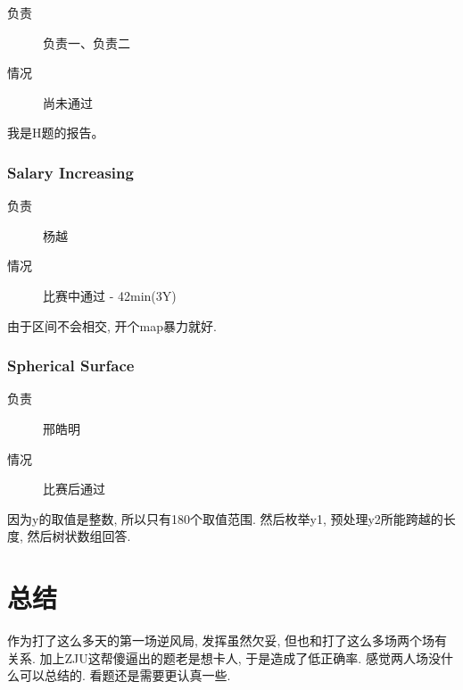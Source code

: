 \documentclass[a4paper, 11pt, nofonts, nocap, fancyhdr]{ctexart}
\newcommand{\problem}[1]{\subsubsection{#1}}
\begin{document}
\begin{description}
\item[负责] 负责一、负责二
\item[情况] 尚未通过
\end{description}

我是H题的报告。

\problem{Salary Increasing}

\begin{description}
\item[负责] 杨越
\item[情况] 比赛中通过 - 42min(3Y)
\end{description}

由于区间不会相交, 开个map暴力就好.

\problem{Spherical Surface}

\begin{description}
\item[负责] 邢皓明
\item[情况] 比赛后通过
\end{description}

因为y的取值是整数, 所以只有180个取值范围. 然后枚举y1, 预处理y2所能跨越的长度, 然后树状数组回答.

\section{总结}

作为打了这么多天的第一场逆风局, 发挥虽然欠妥, 但也和打了这么多场两个场有关系. 加上ZJU这帮傻逼出的题老是想卡人, 于是造成了低正确率. 感觉两人场没什么可以总结的. 看题还是需要更认真一些.
\end{document}
